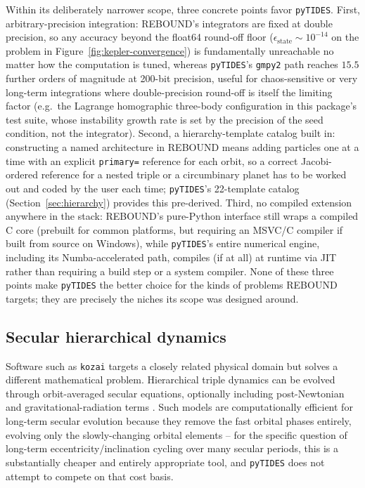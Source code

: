 \documentclass[11pt]{article}
\begin{document}
Within its deliberately narrower scope, three concrete points favor
\texttt{pyTIDES}. First, arbitrary-precision integration: REBOUND's
integrators are fixed at double precision, so any accuracy beyond the
float64 round-off floor ($\epsilon_{\mathrm{state}}\sim10^{-14}$ on the
problem in Figure~\ref{fig:kepler-convergence}) is fundamentally
unreachable no matter how the computation is tuned, whereas
\texttt{pyTIDES}'s \texttt{gmpy2} path reaches $15.5$ further orders of
magnitude at 200-bit precision, useful for chaos-sensitive or very
long-term integrations where double-precision round-off is itself the
limiting factor (e.g.\ the Lagrange homographic three-body configuration in
this package's test suite, whose instability growth rate is set by the
precision of the seed condition, not the integrator). Second, a
hierarchy-template catalog built in: constructing a named architecture in
REBOUND means adding particles one at a time with an explicit
\texttt{primary=} reference for each orbit, so a correct Jacobi-ordered
reference for a nested triple or a circumbinary planet has to be worked out
and coded by the user each time; \texttt{pyTIDES}'s 22-template catalog
(Section~\ref{sec:hierarchy}) provides this pre-derived. Third, no compiled
extension anywhere in the stack: REBOUND's pure-Python interface still
wraps a compiled C core (prebuilt for common platforms, but requiring an
MSVC/C compiler if built from source on Windows), while \texttt{pyTIDES}'s
entire numerical engine, including its Numba-accelerated path, compiles (if
at all) at runtime via JIT rather than requiring a build step or a system
compiler. None of these three points make \texttt{pyTIDES} the better
choice for the kinds of problems REBOUND targets; they are precisely the
niches its scope was designed around.


\subsection{Secular hierarchical dynamics}

Software such as \texttt{kozai} targets a closely related physical domain but
solves a different mathematical problem. Hierarchical triple dynamics can be
evolved through orbit-averaged secular equations, optionally including
post-Newtonian and gravitational-radiation terms \citep{Blaes2002}. Such
models are computationally efficient for long-term secular evolution
because they remove the fast orbital phases entirely, evolving only the
slowly-changing orbital elements -- for the specific question of long-term
eccentricity/inclination cycling over many secular periods, this is a
substantially cheaper and entirely appropriate tool, and \texttt{pyTIDES}
does not attempt to compete on that cost basis.
\end{document}
